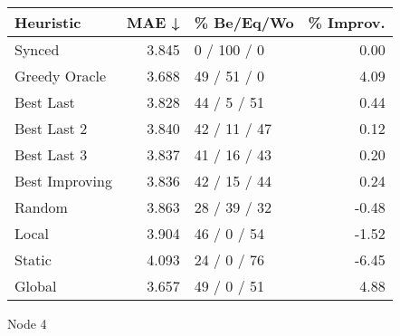 \begin{tabular}{lrlr}
\toprule
\textbf{Heuristic} & \textbf{MAE ↓} & \textbf{\% Be/Eq/Wo} & \textbf{\% Improv.} \\
\midrule
            Synced &          3.845 &          0 / 100 / 0 &                0.00 \\
     Greedy Oracle &          3.688 &          49 / 51 / 0 &                4.09 \\
         Best Last &          3.828 &          44 / 5 / 51 &                0.44 \\
       Best Last 2 &          3.840 &         42 / 11 / 47 &                0.12 \\
       Best Last 3 &          3.837 &         41 / 16 / 43 &                0.20 \\
    Best Improving &          3.836 &         42 / 15 / 44 &                0.24 \\
            Random &          3.863 &         28 / 39 / 32 &               -0.48 \\
             Local &          3.904 &          46 / 0 / 54 &               -1.52 \\
            Static &          4.093 &          24 / 0 / 76 &               -6.45 \\
            Global &          3.657 &          49 / 0 / 51 &                4.88 \\
\bottomrule
\end{tabular}
\caption{Node 4}
\label{tab:ds_non_lr05_le2_bs2_4}
